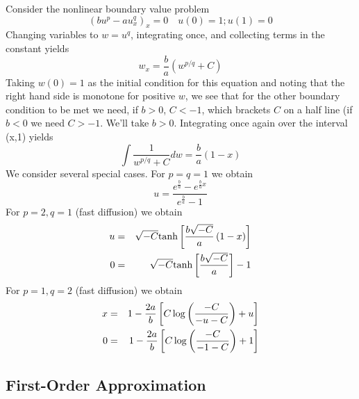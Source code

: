 \documentclass[10pt,dvips,twoside,reqno]{amsart}
\begin{document}
Consider the nonlinear boundary value problem
\begin{equation}
(b u^p - a u^q_x)_x = 0 \quad u(0) = 1; u(1) = 0
\end{equation}
Changing variables to $w=u^q$, integrating once, and collecting terms in the constant yields
\begin{equation}
w_x = \frac{b}{a}(w^{p/q} + C)
\end{equation}
Taking $w(0)=1$ as the initial condition for this equation and noting
that the right hand side is monotone for positive $w$, we see that for
the other boundary condition to be met we need, if $b>0$, $C<-1$,
which brackets $C$ on a half line (if $b<0$ we need $C > -1$. We'll
take $b>0$.  Integrating once again over the interval (x,1) yields
\begin{equation}
\int \frac{1}{w^{p/q} + C} dw = \frac{b}{a}(1 - x)
\end{equation}  
We consider several special cases. For $p=q=1$ we obtain
\begin{equation}
u = \frac{e^{\frac{b}{a}} - e^{\frac{b}{a} x}}{e^{\frac{b}{a}} - 1}
\end{equation}
For $p=2,q=1$ (fast diffusion) we obtain
\begin{eqnarray}
u &=& \sqrt{-C} \mbox{tanh}\left[ \frac{b\sqrt{-C}}{a} \left( 1 - x \right) \right] \\
0 &=&  \sqrt{-C} \mbox{tanh}\left[ \frac{b\sqrt{-C}}{a}  \right] - 1
\end{eqnarray}
For $p=1,q=2$ (fast diffusion) we obtain
\begin{eqnarray}
x &=& 1 - \frac{2a}{b}\left[ C \log \left( \frac{-C}{-u - C} \right) + u\right] \\
0 &=& 1 - \frac{2a}{b}\left[ C \log \left( \frac{-C}{-1 -C} \right) + 1\right]
\end{eqnarray}

\subsection{ First-Order Approximation}
\end{document}
